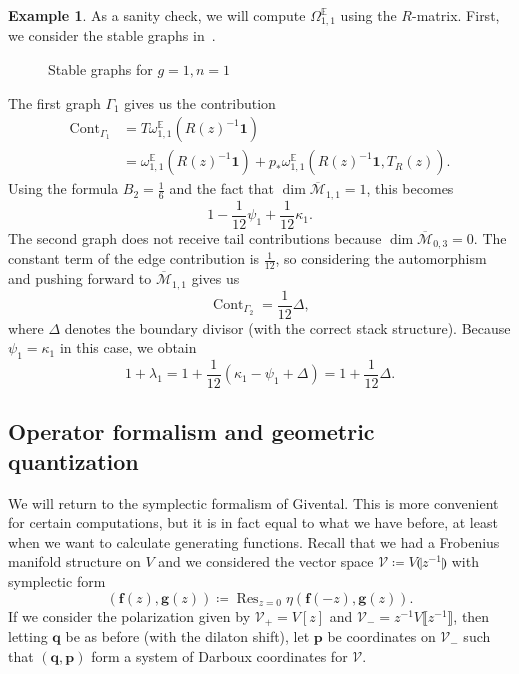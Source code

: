 \documentclass[10pt]{amsart}
\theoremstyle{definition}
\newtheorem{exm}[thm]{Example}
\theoremstyle{remark}
\theoremstyle{plain}
\theoremstyle{definition}
\theoremstyle{remark}
\newcommand{\E}{\mathbb{E}}
\newcommand{\Mbar}{\overline{\mathcal{M}}}
\newcommand{\mc}[1]{\mathcal{#1}}
\newcommand{\mbf}[1]{\mathbf{#1}}
\newcommand{\bq}{\mbf{q}}
\newcommand{\bp}{\mbf{p}}
\newcommand{\on}[1]{\operatorname{#1}}
\newcommand{\1}{\mathbf{1}}
\newcommand{\2}{\mathbf{2}}
\newcommand{\3}{\mathbf{3}}
\newcommand{\ps}[1]{\llbracket #1 \rrbracket}
\newcommand{\ls}[1]{\llparenthesis #1 \rrparenthesis}
\DeclareMathOperator{\Cont}{Cont}
\begin{document}
\begin{exm}
    As a sanity check, we will compute $\Omega_{1,1}^{\E}$ using the $R$-matrix. First, we consider the stable graphs in~.
    \begin{figure}[htpb]
    \begin{center}
    \end{center}
    \caption{Stable graphs for $g=1, n=1$}%
    \label{fig:03graphloop}
    \end{figure}
    The first graph $\Gamma_1$ gives us the contribution
    \begin{align*}
        \Cont_{\Gamma_1} &= T\omega_{1,1}^{\E}(R(z)^{-1}\1) \\
        &= \omega_{1,1}^{\E}(R(z)^{-1}\1) + p_* \omega_{1,1}^{\E}(R(z)^{-1}\1, T_R(z)).
    \end{align*}
    Using the formula $B_2 = \frac{1}{6}$ and the fact that $\dim \Mbar_{1,1} = 1$, this becomes
    \[ 1 - \frac{1}{12}\psi_1 + \frac{1}{12} \kappa_1. \]
    The second graph does not receive tail contributions because $\dim \Mbar_{0,3} = 0$. The constant term of the edge contribution is $\frac{1}{12}$, so considering the automorphism and pushing forward to $\Mbar_{1,1}$ gives us
    \[ \Cont_{\Gamma_2} = \frac{1}{12} \Delta, \]
    where $\Delta$ denotes the boundary divisor (with the correct stack structure). Because $\psi_1 = \kappa_1$ in this case, we obtain
    \[ 1+\lambda_1 = 1 + \frac{1}{12}(\kappa_1 - \psi_1 + \Delta) = 1 + \frac{1}{12} \Delta. \]
\end{exm}

\subsection{Operator formalism and geometric quantization}%
\label{sub:Operator formalism and geometric quantization}

We will return to the symplectic formalism of Givental. This is more convenient for certain computations, but it is in fact equal to what we have before, at least when we want to calculate generating functions. Recall that we had a Frobenius manifold structure on $V$ and we considered the vector space $\mc{V}\coloneqq V\ls{z^{-1}}$ with symplectic form
\[ (\mbf{f}(z), \mbf{g}(z)) \coloneqq \on{Res}_{z=0} \eta(\mbf{f}(-z), \mbf{g}(z)). \]
If we consider the polarization given by $\mc{V}_+ = V[z]$ and $\mc{V}_- = z^{-1}V\ps{z^{-1}}$, then letting $\bq$ be as before (with the dilaton shift), let $\bp$ be coordinates on $\mc{V}_-$ such that $(\bq, \bp)$ form a system of Darboux coordinates for $\mc{V}$.
\end{document}
